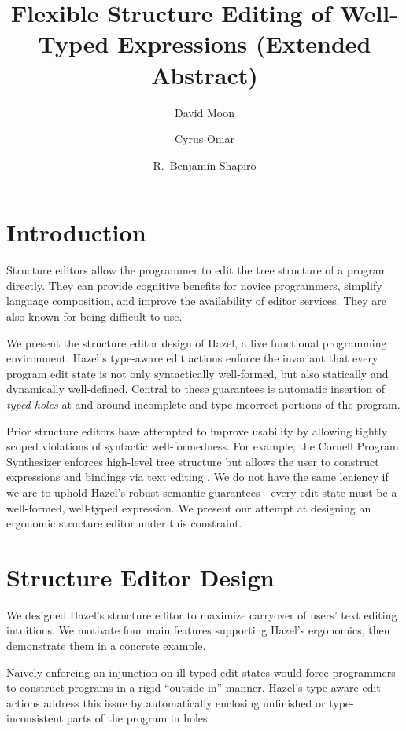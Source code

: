 \documentclass[format=sigplan,dvipsnames,backend=bibtex]{acmart}
\title{Flexible Structure Editing of Well-Typed Expressions (Extended Abstract)}
\author{David Moon}
\affiliation{University of Colorado Boulder}
\author{Cyrus Omar}
\affiliation{University of Chicago}
\author{R.~Benjamin Shapiro}
\affiliation{University of Colorado Boulder}
\newcommand{\Hazel}{\textsf{Hazel}\xspace}
\begin{document}
\maketitle

\section{Introduction}

Structure editors allow the programmer to edit the tree structure of a program directly.
They can provide cognitive benefits for novice programmers, simplify language composition,
  and improve the availability of editor services.
They are also known for being difficult to use.

We present the structure editor design of \Hazel, a live functional programming environment.
	\Hazel's type-aware edit actions enforce the invariant that every program edit state is not only syntactically 
	well-formed, but also statically \cite{Hazelnut} and dynamically \cite{HazelnutLive}
	well-defined.
Central to these guarantees is automatic insertion of \emph{typed holes} at and around 
	incomplete and type-incorrect portions of the program.
	
Prior structure editors have attempted to improve usability by allowing tightly scoped 
	violations of syntactic well-formedness.
For example, the Cornell Program Synthesizer enforces high-level tree structure but
	allows the user to construct expressions and bindings via text editing \cite{Cornell}.
We do not have the same leniency if we are to uphold \Hazel's robust semantic
	guarantees---every edit state must be a well-formed, well-typed expression.
We present our attempt at designing an ergonomic structure editor under this constraint.
	
\section{Structure Editor Design}

We designed \Hazel's structure
	editor to maximize carryover of users' text editing intuitions.
We motivate four main features supporting \Hazel's ergonomics, then demonstrate them
	in a concrete example.
	
\newcommand{\feat}[1]{{\bfseries (#1)}}

Naïvely enforcing an injunction on ill-typed edit states would force programmers to
	construct programs in a rigid ``outside-in'' manner.
\Hazel's type-aware edit actions address this issue by automatically enclosing unfinished
	or type-inconsistent parts of the program in holes.
\end{document}
